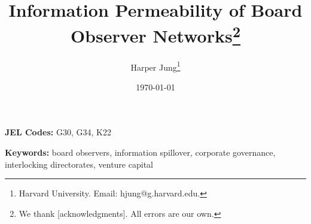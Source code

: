 \documentclass[12pt]{article}
\title{Information Permeability of Board Observer Networks\thanks{We thank [acknowledgments]. All errors are our own.}}
\author{
Harper Jung\thanks{Harvard University. Email: hjung@g.harvard.edu.}
}
\date{\today}
\begin{document}
\maketitle
\thispagestyle{empty}

\begin{abstract}
\noindent \singlespacing

\end{abstract}

\vspace{1em}
\noindent \textbf{JEL Codes:} G30, G34, K22

\vspace{0.5em}
\noindent \textbf{Keywords:} board observers, information spillover, corporate governance, interlocking directorates, venture capital

\newpage
\setcounter{page}{1}







\newpage
\singlespacing



\newpage
\appendix

\end{document}
